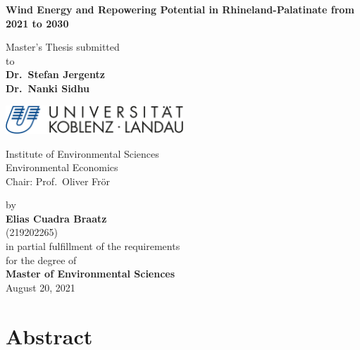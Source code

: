 \documentclass[a4paper,11pt]{article}
\begin{document}
\thispagestyle{empty}
\begin{center}
  \vspace*{5mm}
  \linespread{1.5}
  {\huge{\bf Wind Energy and Repowering Potential in Rhineland-Palatinate from 2021 to 2030}\par}\vspace{1cm}
  Master's Thesis submitted \\\vspace{0.5cm}
  to \\\vspace{0.5cm}
  \textbf{Dr.~Stefan Jergentz} \\
  \textbf{Dr.~Nanki Sidhu} \\\vspace{1.5cm}
  
  
  \includegraphics[width=0.5\textwidth]{Uni-Logo-2.jpg}
  
  Institute of Environmental Sciences \\
  Environmental Economics \\
   Chair: Prof.~Oliver Frör \\  \vspace{1cm}

  
  
  by \\\vspace{0.5cm}
  \textbf{Elias Cuadra Braatz} \\
  (219202265) \\
  
  \medskip
  \medskip
  in partial fulfillment of the requirements \\
  for the degree of \\
  \textbf{Master of Environmental Sciences} \\\vspace{0.5cm}
  August 20, 2021
  
\end{center}


\newpage
\tableofcontents
\clearpage

\newpage
\hypertarget{abstract}{%
\section*{Abstract}\label{abstract}}
\end{document}
